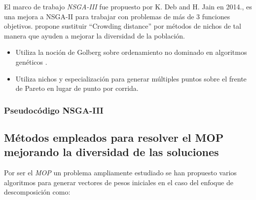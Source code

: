 \documentclass[letterpaper,10pt]{article}
\begin{document}
El marco de trabajo \emph{NSGA-III} fue propuesto por K. Deb and H. Jain en 2014.\cite{6600851}, es una mejora a NSGA-II para trabajar con problemas de más de $3$ funciones objetivos. propone sustituir “Crowding distance” por métodos de nichos de tal manera que ayuden a mejorar la diversidad de la población.


\begin{itemize}
 \item Utiliza la noción de Golberg sobre ordenamiento no dominado en algoritmos genéticos \cite{goldberg1988genetic}.
 \item Utiliza nichos y especialización para generar múltiples puntos sobre el frente de Pareto en lugar de punto por corrida.
\end{itemize}



\subsubsection{Pseudocódigo NSGA-III}
 


\subsection{Métodos empleados para resolver el MOP mejorando la diversidad de las soluciones}

Por ser el \emph{MOP} un problema ampliamente estudiado se han propuesto varios algoritmos para generar vectores de pesos iniciales en el caso del enfoque de descomposición como:
\newline
\end{document}
